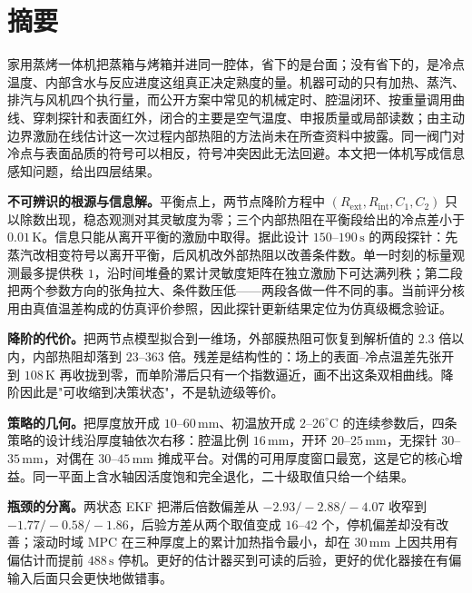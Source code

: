 


\onecolumn
\pagestyle{empty}
\BodyBgfalse
{}
\setcounter{page}{1}
\pagestyle{fancy}
\BodyBgtrue

\chapter*{摘要}

家用蒸烤一体机把蒸箱与烤箱并进同一腔体，省下的是台面；没有省下的，是冷点温度、内部含水与反应进度这组真正决定熟度的量。机器可动的只有加热、蒸汽、排汽与风机四个执行量，而公开方案中常见的机械定时、腔温闭环、按重量调用曲线、穿刺探针和表面红外，闭合的主要是空气温度、申报质量或局部读数；由主动边界激励在线估计这一次过程内部热阻的方法尚未在所查资料中披露。同一阀门对冷点与表面品质的符号可以相反，符号冲突因此无法回避。本文把一体机写成信息感知问题，给出四层结果。

\textbf{不可辨识的根源与信息解。}平衡点上，两节点降阶方程中 \((R_{\mathrm{ext}},R_{\mathrm{int}},C_1,C_2)\) 只以除数出现，稳态观测对其灵敏度为零；三个内部热阻在平衡段给出的冷点差小于 \(0.01\,\mathrm{K}\)。信息只能从离开平衡的激励中取得。据此设计 \(150\)--\(190\,\mathrm{s}\) 的两段探针：先蒸汽改相变符号以离开平衡，后风机改外部热阻以改善条件数。单一时刻的标量观测最多提供秩 \(1\)，沿时间堆叠的累计灵敏度矩阵在独立激励下可达满列秩；第二段把两个参数方向的张角拉大、条件数压低——两段各做一件不同的事。当前评分核用由真值温差构成的仿真评价参照，因此探针更新结果定位为仿真级概念验证。

\textbf{降阶的代价。}把两节点模型拟合到一维场，外部膜热阻可恢复到解析值的 \(2.3\) 倍以内，内部热阻却落到 \(23\)--\(363\) 倍。残差是结构性的：场上的表面--冷点温差先张开到 \(108\,\mathrm{K}\) 再收拢到零，而单阶滞后只有一个指数逼近，画不出这条双相曲线。降阶因此是"可收缩到决策状态"，不是轨迹级等价。

\textbf{策略的几何。}把厚度放开成 \(10\)--\(60\,\mathrm{mm}\)、初温放开成 \(2\)--\(26^\circ\mathrm{C}\) 的连续参数后，四条策略的设计线沿厚度轴依次右移：腔温比例 \(16\,\mathrm{mm}\)，开环 \(20\)--\(25\,\mathrm{mm}\)，无探针 \(30\)--\(35\,\mathrm{mm}\)，对偶在 \(30\)--\(45\,\mathrm{mm}\) 摊成平台。对偶的可用厚度窗口最宽，这是它的核心增益。同一平面上含水轴因活度饱和完全退化，二十级取值只给一个结果。

\textbf{瓶颈的分离。}两状态 EKF 把滞后倍数偏差从 \(-2.93/-2.88/-4.07\) 收窄到 \(-1.77/-0.58/-1.86\)，后验方差从两个取值变成 \(16\)--\(42\) 个，停机偏差却没有改善；滚动时域 MPC 在三种厚度上的累计加热指令最小，却在 \(30\,\mathrm{mm}\) 上因共用有偏估计而提前 \(488\,\mathrm{s}\) 停机。更好的估计器买到可读的后验，更好的优化器接在有偏输入后面只会更快地做错事。

